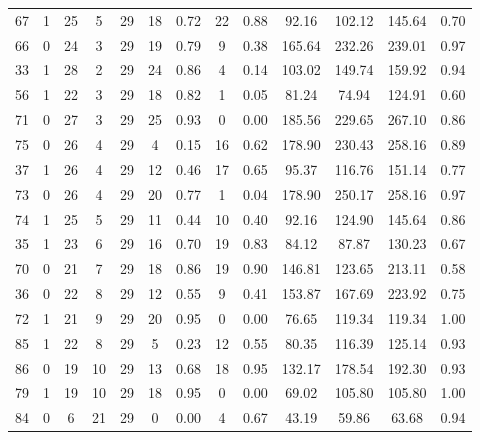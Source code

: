 \documentclass[a4paper,12pt,american]{article}
\theoremstyle{definition}
\begin{document}
\begin{table}[H]
{\begin{tabular}{lcccccccccccc}
	67  &     1 &        25 &      5 &    29 &      18 &    0.72 &     22 &   0.88 &   92.16 &  102.12 &  145.64 &  0.70 \\
	66  &     0 &        24 &      3 &    29 &      19 &    0.79 &      9 &   0.38 &  165.64 &  232.26 &  239.01 &  0.97 \\
	33  &     1 &        28 &      2 &    29 &      24 &    0.86 &      4 &   0.14 &  103.02 &  149.74 &  159.92 &  0.94 \\
	56  &     1 &        22 &      3 &    29 &      18 &    0.82 &      1 &   0.05 &   81.24 &   74.94 &  124.91 &  0.60 \\
	71  &     0 &        27 &      3 &    29 &      25 &    0.93 &      0 &   0.00 &  185.56 &  229.65 &  267.10 &  0.86 \\
	75  &     0 &        26 &      4 &    29 &       4 &    0.15 &     16 &   0.62 &  178.90 &  230.43 &  258.16 &  0.89 \\
	37  &     1 &        26 &      4 &    29 &      12 &    0.46 &     17 &   0.65 &   95.37 &  116.76 &  151.14 &  0.77 \\
	73  &     0 &        26 &      4 &    29 &      20 &    0.77 &      1 &   0.04 &  178.90 &  250.17 &  258.16 &  0.97 \\
	74  &     1 &        25 &      5 &    29 &      11 &    0.44 &     10 &   0.40 &   92.16 &  124.90 &  145.64 &  0.86 \\
	35  &     1 &        23 &      6 &    29 &      16 &    0.70 &     19 &   0.83 &   84.12 &   87.87 &  130.23 &  0.67 \\
	70  &     0 &        21 &      7 &    29 &      18 &    0.86 &     19 &   0.90 &  146.81 &  123.65 &  213.11 &  0.58 \\
	36  &     0 &        22 &      8 &    29 &      12 &    0.55 &      9 &   0.41 &  153.87 &  167.69 &  223.92 &  0.75 \\
	72  &     1 &        21 &      9 &    29 &      20 &    0.95 &      0 &   0.00 &   76.65 &  119.34 &  119.34 &  1.00 \\
	85  &     1 &        22 &      8 &    29 &       5 &    0.23 &     12 &   0.55 &   80.35 &  116.39 &  125.14 &  0.93 \\
	86  &     0 &        19 &     10 &    29 &      13 &    0.68 &     18 &   0.95 &  132.17 &  178.54 &  192.30 &  0.93 \\
	79  &     1 &        19 &     10 &    29 &      18 &    0.95 &      0 &   0.00 &   69.02 &  105.80 &  105.80 &  1.00 \\
	84  &     0 &         6 &     21 &    29 &       0 &    0.00 &      4 &   0.67 &   43.19 &   59.86 &   63.68 &  0.94 \\

\end{tabular}}
\end{table}
\end{document}
